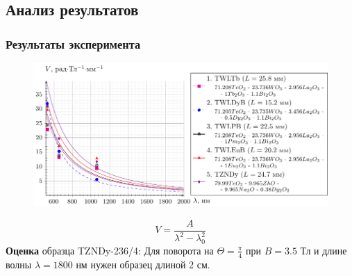 \documentclass[10pt,pdf,hyperref={unicode}, dvipsnames]{beamer}
\begin{document}

\begin{frame}[t]
	\subsection{Анализ результатов}
	\frametitle{Результаты эксперимента}

	\vspace{-1em}
	\begin{figure}[tb]
		\centering
		\includegraphics[width=1\textwidth]{images/graph_verde_from_lambda2}
	\end{figure}
	\vspace{-1em}
	\begin{equation*}
		V=
		\frac{A}{\lambda^2-\lambda_0^2}
	\end{equation*}	
	\textbf{Оценка} образца TZNDy-236/4: Для поворота на $\Theta=\frac{\pi}{4}$ при $B=3.5$ Тл и длине волны $\lambda=1800$ нм нужен образец длиной 2 см.
	
	
	
\end{frame}

\end{document}
